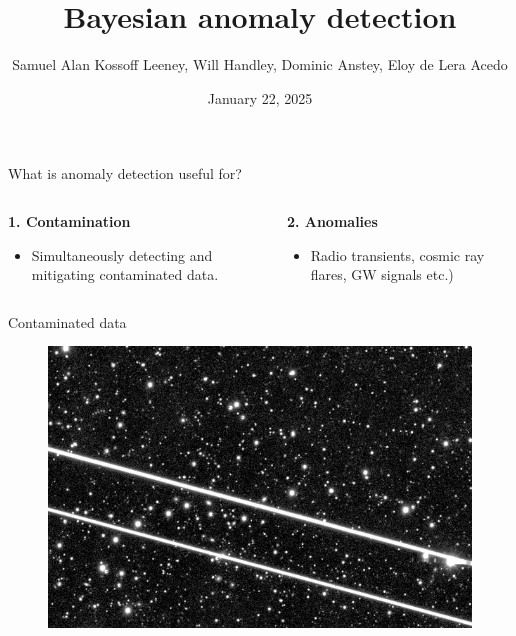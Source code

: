 \documentclass[aspectratio=169]{beamer}
\title{Bayesian anomaly detection}
\date{January 22, 2025}
\author{Samuel Alan Kossoff Leeney, Will Handley, Dominic Anstey, Eloy de Lera Acedo}
\institute{Will Handley's group meeting}
\begin{document}
\begin{frame}
  \titlepage
\end{frame}

\begin{frame}{What is anomaly detection useful for?}
  \begin{columns}
    \begin{column}{0.5\textwidth}
        \textbf{1. Contamination}
        \begin{itemize}
          \item Simultaneously detecting and mitigating contaminated data.
        \end{itemize}
    \end{column}
    \begin{column}{0.5\textwidth}
        \textbf{2. Anomalies}
        \begin{itemize}
          \item Radio transients, cosmic ray flares, GW signals etc.)
        \end{itemize}
    \end{column}
  \end{columns}
\end{frame}

\begin{frame}{Contaminated data}
  \begin{figure}
    \centering
    \includegraphics[width=\textwidth]{images/starlink2.png}
  \end{figure}
\end{frame}
\end{document}
